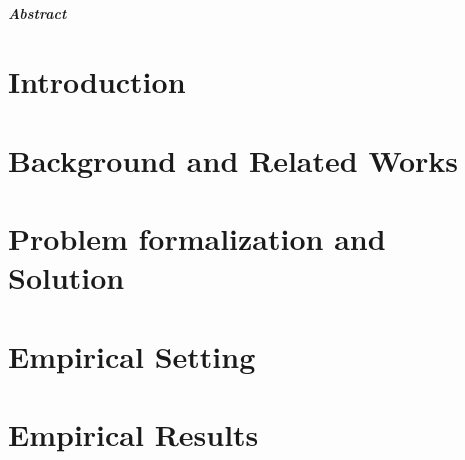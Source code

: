 \documentclass[12pt, titlepage, a4paper]{book}
\begin{document}
\begin{frontespizio}
\Rientro {1.5cm}
\end{frontespizio}



% 
% 

\tableofcontents

\newpage

\paragraph{Abstract}


\chapter{Introduction}\label{chap:intro}



\chapter{Background and Related Works}\label{chap:related}


\chapter{Problem formalization and Solution}\label{chap:problem}




\chapter{Empirical Setting} \label{chap:ros}


\chapter{Empirical Results}\label{chap:results}


\end{document}
